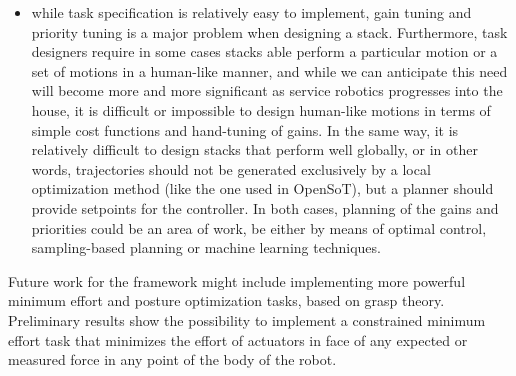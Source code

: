 \documentclass[%
	paper=A4,					%
	twoside=true,				%
	openright,			.
	parskip=full,				%
	chapterprefix=true,			%
	11pt,						%
	headings=normal,			%
	bibliography=totoc,			%
	listof=totoc,				%
	titlepage=on,				%
	captions=tableabove,		%
	draft=true,				%
]{scrreprt}%
\begin{document}
\begin{itemize}
 \item while task specification is relatively easy to implement, gain tuning and priority tuning is a major problem when designing a stack. Furthermore, task designers require in some cases stacks able perform a particular motion or a set of motions in a human-like manner, and while we can anticipate this need will become more and more significant as service robotics progresses into the house, it is difficult or impossible to design human-like motions in terms of simple cost functions and hand-tuning of gains. In the same way, it is relatively difficult to design stacks that perform well globally, or in other words, trajectories should not be generated exclusively by a local optimization method (like the one used in OpenSoT), but a planner should provide setpoints for the controller. In both cases, planning of the gains and priorities could be an area of work, be either by means of optimal control, sampling-based planning or machine learning techniques.
\end{itemize}
Future work for the framework might include implementing more powerful minimum effort and posture optimization tasks, based on grasp theory. Preliminary results show the possibility to implement a constrained minimum effort task that minimizes the effort of actuators in face of any expected or measured force in any point of the body of the robot.
\cleardoublepage

{%
\renewcommand{\bibfont}{\normalfont\small}
\setlength{\biblabelsep}{0pt}
\setlength{\bibitemsep}{0.5\baselineskip plus 0.5\baselineskip}
\printbibliography[nottype=online]
\printbibliography[heading=subbibliography,title={Websites},type=online,prefixnumbers={@}]
}
\cleardoublepage



%

%

\end{document}
